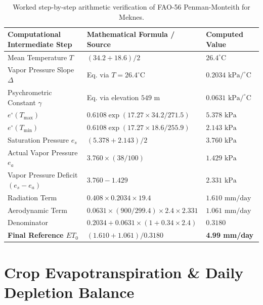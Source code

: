 \documentclass[11pt,a4paper,oneside]{report}
\begin{document}
\begin{table}[h!]
\centering
\small
\begin{tabularx}{0.85\linewidth}{lXl}
\toprule
\textbf{Computational Intermediate Step} & \textbf{Mathematical Formula / Source} & \textbf{Computed Value} \\
\midrule
Mean Temperature $T$ & $(34.2 + 18.6) / 2$ & $26.4^\circ\text{C}$ \\
Vapor Pressure Slope $\Delta$ & Eq. via $T=26.4^\circ\text{C}$ & $0.2034\text{ kPa/}^\circ\text{C}$ \\
Psychrometric Constant $\gamma$ & Eq. via elevation $549\text{ m}$ & $0.0631\text{ kPa/}^\circ\text{C}$ \\
$e^\circ(T_{\max})$ & $0.6108 \exp(17.27 \times 34.2 / 271.5)$ & $5.378\text{ kPa}$ \\
$e^\circ(T_{\min})$ & $0.6108 \exp(17.27 \times 18.6 / 255.9)$ & $2.143\text{ kPa}$ \\
Saturation Pressure $e_s$ & $(5.378 + 2.143) / 2$ & $3.760\text{ kPa}$ \\
Actual Vapor Pressure $e_a$ & $3.760 \times (38 / 100)$ & $1.429\text{ kPa}$ \\
Vapor Pressure Deficit $(e_s - e_a)$ & $3.760 - 1.429$ & $2.331\text{ kPa}$ \\
Radiation Term & $0.408 \times 0.2034 \times 19.4$ & $1.610\text{ mm/day}$ \\
Aerodynamic Term & $0.0631 \times (900/299.4) \times 2.4 \times 2.331$ & $1.061\text{ mm/day}$ \\
Denominator & $0.2034 + 0.0631 \times (1 + 0.34 \times 2.4)$ & $0.3180$ \\
\midrule
\textbf{Final Reference $ET_0$} & $(1.610 + 1.061) / 0.3180$ & \textbf{4.99 mm/day} \\
\bottomrule
\end{tabularx}
\caption{Worked step-by-step arithmetic verification of FAO-56 Penman-Monteith for Meknes.}
\label{tab:fao56_demo}
\end{table}

\chapter{Crop Evapotranspiration \& Daily Depletion Balance}
\end{document}

